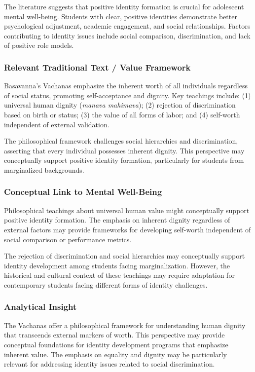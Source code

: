 \documentclass[12pt,a4paper,twocolumn]{article}
\begin{document}
The literature suggests that positive identity formation is crucial for adolescent mental well-being. Students with clear, positive identities demonstrate better psychological adjustment, academic engagement, and social relationships. Factors contributing to identity issues include social comparison, discrimination, and lack of positive role models.

\subsubsection{Relevant Traditional Text / Value Framework}

Basavanna's Vachanas emphasize the inherent worth of all individuals regardless of social status, promoting self-acceptance and dignity. Key teachings include: (1) universal human dignity (\textit{manava mahimava}); (2) rejection of discrimination based on birth or status; (3) the value of all forms of labor; and (4) self-worth independent of external validation.

The philosophical framework challenges social hierarchies and discrimination, asserting that every individual possesses inherent dignity. This perspective may conceptually support positive identity formation, particularly for students from marginalized backgrounds.

\subsubsection{Conceptual Link to Mental Well-Being}

Philosophical teachings about universal human value might conceptually support positive identity formation. The emphasis on inherent dignity regardless of external factors may provide frameworks for developing self-worth independent of social comparison or performance metrics.

The rejection of discrimination and social hierarchies may conceptually support identity development among students facing marginalization. However, the historical and cultural context of these teachings may require adaptation for contemporary students facing different forms of identity challenges.

\subsubsection{Analytical Insight}

The Vachanas offer a philosophical framework for understanding human dignity that transcends external markers of worth. This perspective may provide conceptual foundations for identity development programs that emphasize inherent value. The emphasis on equality and dignity may be particularly relevant for addressing identity issues related to social discrimination.
\end{document}
